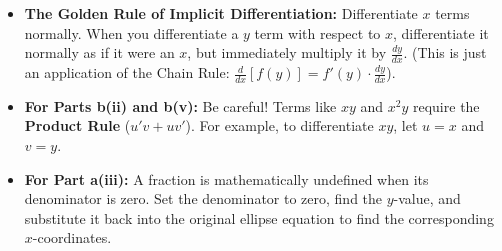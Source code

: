 \begin{hint}
\begin{itemize}
    \item \textbf{The Golden Rule of Implicit Differentiation:} Differentiate $x$ terms normally. When you differentiate a $y$ term with respect to $x$, differentiate it normally as if it were an $x$, but immediately multiply it by $\frac{dy}{dx}$. (This is just an application of the Chain Rule: $\frac{d}{dx}[f(y)] = f'(y) \cdot \frac{dy}{dx}$).
    \item \textbf{For Parts b(ii) and b(v):} Be careful! Terms like $xy$ and $x^2y$ require the \textbf{Product Rule} ($u'v + uv'$). For example, to differentiate $xy$, let $u=x$ and $v=y$. 
    \item \textbf{For Part a(iii):} A fraction is mathematically undefined when its denominator is zero. Set the denominator to zero, find the $y$-value, and substitute it back into the original ellipse equation to find the corresponding $x$-coordinates. 
\end{itemize}
\end{hint}

